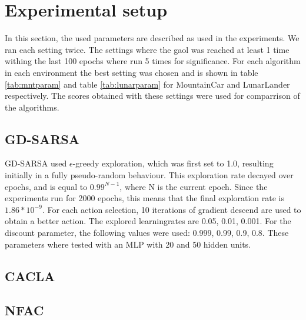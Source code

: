 
\section{Experimental setup}


In this section, the used parameters are described as used in the experiments. We ran each setting twice. The settings where the gaol was reached at least 1 time withing the last 100 epochs where run 5 times for significance. For each algorithm in each environment the best setting was chosen and is shown in table \ref{tab:mntparam} and table \ref{tab:lunarparam} for MountainCar and LunarLander respectively. The scores obtained with these settings were used for comparrison of the algorithms. 
\subsection{GD-SARSA}
GD-SARSA used $\epsilon$-greedy exploration, which was first set to 1.0, resulting initially in a fully pseudo-random behaviour. This exploration rate decayed over epochs, and is equal to $0.99^{N-1}$, where N is the current epoch. Since the experiments run for 2000 epochs, this means that the final exploration rate is $1.86*10^{-9}$. For each action selection, 10 iterations of gradient descend are used to obtain a better action. The explored learningrates are 0.05, 0.01, 0.001. For the discount parameter, the following values were used: 0.999, 0.99, 0.9, 0.8. These parameters where tested with an MLP with 20 and 50 hidden units.
\subsection{CACLA}
\subsection{NFAC}


